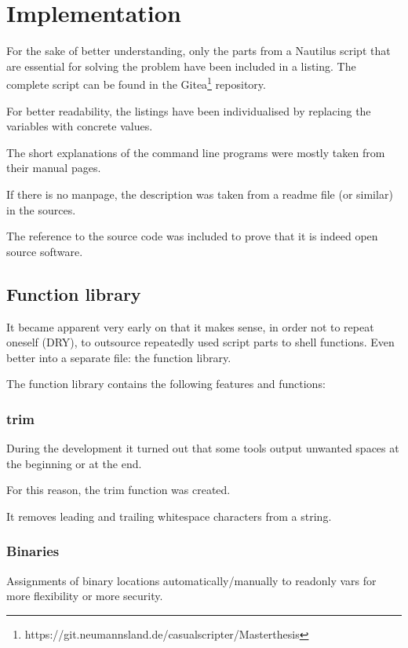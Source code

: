 \chapter{Implementation}
\label{chap:implementation}

For the sake of better understanding, only the parts from a Nautilus script that are essential for solving the problem have been included in a listing. The complete script can be found in the Gitea\footnote{https://git.neumannsland.de/casualscripter/Masterthesis} repository.

For better readability, the listings have been individualised by replacing the variables with concrete values.

The short explanations of the command line programs were mostly taken from their manual pages.

If there is no manpage, the description was taken from a readme file (or similar) in the sources.

The reference to the source code was included to prove that it is indeed open source software.

\section{Function library}

It became apparent very early on that it makes sense, in order not to repeat oneself (DRY), to outsource repeatedly used script parts to shell functions. Even better into a separate file: the function library.

The function library contains the following features and functions:

\subsection{trim}

During the development it turned out that some tools output unwanted spaces at the beginning or at the end.

For this reason, the trim function was created.

It removes leading and trailing whitespace characters from a string.

\subsection{Binaries}

Assignments of binary locations automatically/manually to readonly vars for more flexibility or more security.

